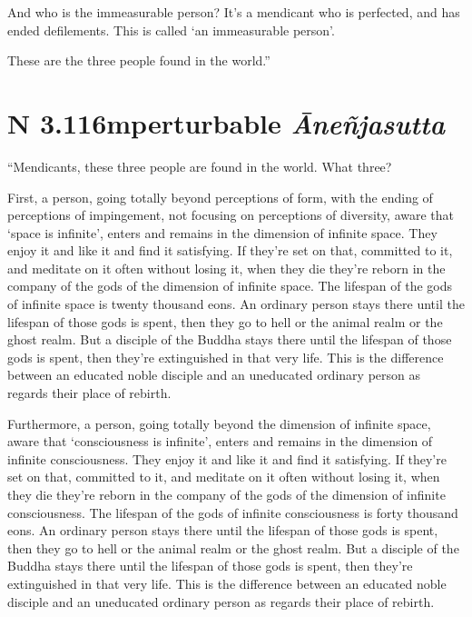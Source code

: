 \documentclass[12pt,openany]{book}%
\newcommand*{\suttatitleacronym}[1]{\smaller[2]{#1}\vspace*{.3em}}
\newcommand*{\suttatitletranslation}[1]{\linebreak{#1}}
\newcommand*{\suttatitleroot}[1]{\linebreak\smaller[2]\itshape{#1}}
\newcommand*{\tocacronym}[1]{\hspace*{-3.3em}{#1}\quad}
\newcommand*{\toctranslation}[1]{#1}
\newcommand*{\tocroot}[1]{(\textit{#1})}
\begin{document}
And who is the immeasurable person? It’s a mendicant who is perfected, and has ended defilements. This is called ‘an immeasurable person’. 

These are the three people found in the world.” 

%
\section*{{\suttatitleacronym AN 3.116}{\suttatitletranslation Imperturbable }{\suttatitleroot Āneñjasutta}}
\addcontentsline{toc}{section}{\tocacronym{AN 3.116} \toctranslation{Imperturbable } \tocroot{Āneñjasutta}}

“Mendicants, these three people are found in the world. What three? 

First, a person, going totally beyond perceptions of form, with the ending of perceptions of impingement, not focusing on perceptions of diversity, aware that ‘space is infinite’, enters and remains in the dimension of infinite space. They enjoy it and like it and find it satisfying. If they’re set on that, committed to it, and meditate on it often without losing it, when they die they’re reborn in the company of the gods of the dimension of infinite space. The lifespan of the gods of infinite space is twenty thousand eons. An ordinary person stays there until the lifespan of those gods is spent, then they go to hell or the animal realm or the ghost realm. But a disciple of the Buddha stays there until the lifespan of those gods is spent, then they’re extinguished in that very life. This is the difference between an educated noble disciple and an uneducated ordinary person as regards their place of rebirth. 

Furthermore, a person, going totally beyond the dimension of infinite space, aware that ‘consciousness is infinite’, enters and remains in the dimension of infinite consciousness. They enjoy it and like it and find it satisfying. If they’re set on that, committed to it, and meditate on it often without losing it, when they die they’re reborn in the company of the gods of the dimension of infinite consciousness. The lifespan of the gods of infinite consciousness is forty thousand eons. An ordinary person stays there until the lifespan of those gods is spent, then they go to hell or the animal realm or the ghost realm. But a disciple of the Buddha stays there until the lifespan of those gods is spent, then they’re extinguished in that very life. This is the difference between an educated noble disciple and an uneducated ordinary person as regards their place of rebirth. 
\end{document}
